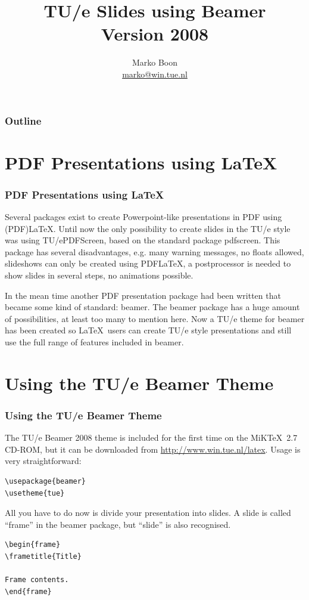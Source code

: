 \documentclass[t]{beamer}
\title{\Huge TU/e Slides using Beamer\\\Large Version 2008}
\author{Marko Boon\\ \href{mailto:marko@win.tue.nl}{marko@win.tue.nl}}
\begin{document}
\begin{frame}
\maketitle
\end{frame}

\begin{frame}
  \frametitle{Outline}
  \tableofcontents[pausesections]
\end{frame}

\section{PDF Presentations using \LaTeX}
\begin{frame}
\frametitle{PDF Presentations using \LaTeX}
Several packages exist to create Powerpoint-like presentations in PDF using (PDF)\LaTeX. Until now the only possibility to create slides in the
TU/e style was using TU/ePDFScreen, based on the standard package \textsf{pdfscreen}. This package has several disadvantages, e.g. many warning messages, no floats allowed, slideshows can only be created using PDF\LaTeX, a postprocessor is needed to show slides in several steps, no animations possible.

In the mean time another PDF presentation package had been written that became some kind of standard: {\sf beamer}. The beamer package has a huge amount of possibilities, at least too many to mention here. Now a TU/e theme for beamer has been created so \LaTeX\ users can create TU/e style presentations and still use the full range of features included in {\sf beamer}.
\end{frame}

\section{Using the TU/e Beamer Theme}
\begin{slidetop}
\frametitle{Using the TU/e Beamer Theme}

The TU/e Beamer 2008 theme is included for the first time on the MiK\TeX\ 2.7 CD-ROM, but it can be downloaded from \href{http://www.win.tue.nl/latex}{http://www.win.tue.nl/latex}. Usage is very straightforward:

\begin{lstlisting}
\usepackage{beamer}
\usetheme{tue}
\end{lstlisting}

All you have to do now is divide your presentation into slides. A slide is called ``frame'' in the {\sf beamer} package, but ``slide'' is also recognised.

\begin{lstlisting}
\begin{frame}
\frametitle{Title}

Frame contents.
\end{frame}
\end{lstlisting}
\end{slidetop}
\end{document}
